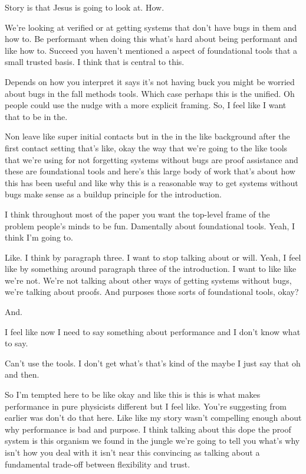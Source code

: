 \begin{subappendices}
Story is that Jesus is going to look at. How.

We're looking at verified or at getting systems that don't have bugs in them and how to. Be performant when doing this what's hard about being performant and like how to. Succeed you haven't mentioned a aspect of foundational tools that a small trusted basis. I think that is central to this.

Depends on how you interpret it says it's not having buck you might be worried about bugs in the fall methods tools. Which case perhaps this is the unified. Oh people could use the nudge with a more explicit framing. So, I feel like I want that to be in the.

Non leave like super initial contacts but in the in the like background after the first contact setting that's like, okay the way that we're going to the like tools that we're using for not forgetting systems without bugs are proof assistance and these are foundational tools and here's this large body of work that's about how this has been useful and like why this is a reasonable way to get systems without bugs make sense as a buildup principle for the introduction.

I think throughout most of the paper you want the top-level frame of the problem people's minds to be fun. Damentally about foundational tools. Yeah, I think I'm going to.

Like. I think by paragraph three. I want to stop talking about or will. Yeah, I feel like by something around paragraph three of the introduction. I want to like like we're not. We're not talking about other ways of getting systems without bugs, we're talking about proofs. And purposes those sorts of foundational tools, okay?

And.

I feel like now I need to say something about performance and I don't know what to say.

Can't use the tools. I don't get what's that's kind of the maybe I just say that oh and then.

So I'm tempted here to be like okay and like this is this is what makes performance in pure physicists different but I feel like. You're suggesting from earlier was don't do that here. Like like my story wasn't compelling enough about why performance is bad and purpose. I think talking about this dope the proof system is this organism we found in the jungle we're going to tell you what's why isn't how you deal with it isn't near this convincing as talking about a fundamental trade-off between flexibility and trust.


\end{subappendices}
